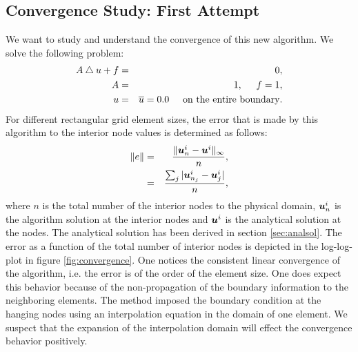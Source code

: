 \documentclass[a4paper,12pt]{article}
\newcommand{\mb}[1]{{\mbox{\boldmath$#1$\unboldmath}}}
\begin{document}
\subsection{Convergence Study: First Attempt}\label{sec:erroranalysis}
We want to study and understand the convergence of this new algorithm. We solve the following problem: 
\begin{eqnarray}
A \bigtriangleup u + f &=& 0,\\
A &=& 1, \hspace{0.5cm} f = 1,\\
u &=& \overline{u} = 0.0 \hspace{0.5cm} \text{on the entire boundary}.
\end{eqnarray}
For different rectangular grid element sizes, the error that is made by this algorithm to the interior node values is determined as follows:
\begin{eqnarray}\label{eqn:H0norm}
\Vert e \Vert &=& \frac{\Vert \mb{u}_n^i - \mb{u}^i \Vert_{\infty}}{n},\\
 &=& \frac{ \sum_j  \vert \mb{u}_{n_{j}}^i - \mb{u}_j^i \vert}{n},
\end{eqnarray}
where $n$ is the total number of the interior nodes to the physical domain, $\mb{u}_n^i$ is the algorithm solution at the interior nodes and $\mb{u}^i$ is the analytical solution at the nodes. The analytical solution has been derived in section \ref{sec:analsol}.
The error as a function of the total number of interior nodes is depicted in the log-log-plot in figure \ref{fig:convergence}. One notices the consistent linear convergence of the algorithm, i.e. the error is of the order of the element size. One does expect this behavior because of the non-propagation of the boundary information to the neighboring elements. The method imposed the boundary condition at the hanging nodes using an interpolation equation in the domain of one element. We suspect that the expansion of the interpolation domain will effect the convergence behavior positively.
\end{document}
